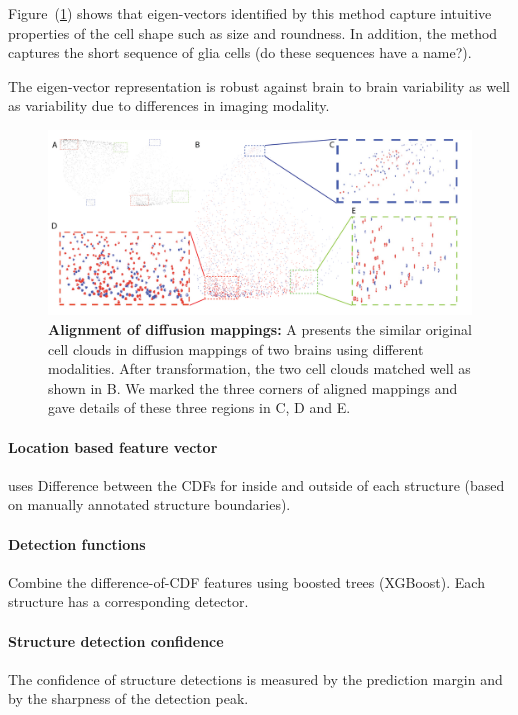 \documentclass[11pt]{article}
\begin{document}
Figure~(\ref{fig:eigenmap}) shows that eigen-vectors identified by this method capture intuitive
properties of the cell shape such as size and roundness. In addition,
the method captures the short sequence  of glia cells (do these sequences
have a name?).

The eigen-vector representation is robust against brain to brain
variability as well as variability due to differences in imaging
modality.

\begin{figure}[t]
  \includegraphics[width=\textwidth]{figures/Diffusionmap.png}
  \caption{\label{fig:eigenmap}{\bf Alignment of diffusion mappings:} A presents the
    similar original cell clouds in diffusion mappings of two brains
    using different modalities. After transformation, the two cell
    clouds matched well as shown in B. We marked the three corners of
    aligned mappings and gave details of these three regions in C, D
    and E.  }
\end{figure}

\paragraph{Location based feature vector} uses Difference between the CDFs for inside and outside of each structure (based on manually annotated structure boundaries). 
\paragraph{Detection functions} Combine the difference-of-CDF
features using boosted trees (XGBoost). Each structure has a
corresponding detector.

\paragraph{Structure detection confidence} The confidence of structure
  detections is measured by the prediction margin and by the sharpness
  of the detection peak.
\end{document}
